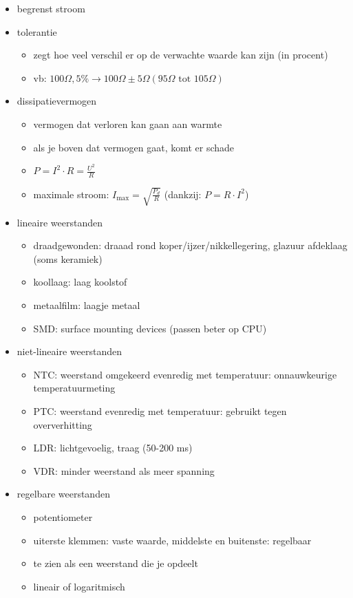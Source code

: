 \documentclass[11pt]{article}
\let\originalitem\item
\renewcommand{\item}{\originalitem[]}
\begin{document}
\begin{preview}
\begin{itemize}
	\item begrenst stroom
	\item tolerantie
	\begin{itemize}
		\item zegt hoe veel verschil er op de verwachte waarde kan zijn (in procent)
		\item vb: $100 \Omega, 5\% \rightarrow 100 \Omega \pm 5 \Omega (95 \Omega \textrm{ tot } 105 \Omega)$
	\end{itemize}
	\item dissipatievermogen
	\begin{itemize}
		\item vermogen dat verloren kan gaan aan warmte
		\item als je boven dat vermogen gaat, komt er schade
		\item $P = I^2 \cdot R = \frac{U^2}{R}$
		\item maximale stroom: $I_{\textrm{max}} = \sqrt{\frac{P_d}{R}}$ (dankzij: $P=R \cdot I^2$)
	\end{itemize}
	\item lineaire weerstanden
	\begin{itemize}
		\item draadgewonden: draaad rond koper/ijzer/nikkellegering, glazuur afdeklaag (soms keramiek)
		\item koollaag: laag koolstof
		\item metaalfilm: laagje metaal
		\item SMD: surface mounting devices (passen beter op CPU)
	\end{itemize}
	\item niet-lineaire weerstanden
	\begin{itemize}
		\item NTC: weerstand omgekeerd evenredig met temperatuur: onnauwkeurige temperatuurmeting
		\item PTC: weerstand evenredig met temperatuur: gebruikt tegen oververhitting
		\item LDR: lichtgevoelig, traag (50-200 ms)
		\item VDR: minder weerstand als meer spanning
	\end{itemize}
	\item regelbare weerstanden
	\begin{itemize}
		\item potentiometer
		\item uiterste klemmen: vaste waarde, middelste en buitenste: regelbaar
		\item te zien als een weerstand die je opdeelt
		\item lineair of logaritmisch
	\end{itemize}
\end{itemize}


\end{preview}
\end{document}
